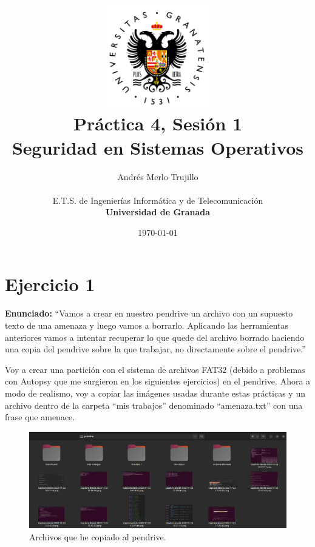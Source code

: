 \documentclass{article}
\title{
\includegraphics[width=1.75in]{imagenes/UGR-Logo.png} \\
\vspace*{1in}
\textbf{Práctica 4, Sesión 1} \\
Seguridad en Sistemas Operativos \\
\vspace*{0.5in}}
\author{Andrés Merlo Trujillo \\
\vspace*{0.5in} \\
E.T.S. de Ingenierías Informática y de Telecomunicación \\
\textbf{Universidad de Granada}} \date{\today}
\begin{document}
\begin{titlingpage}
\maketitle
\end{titlingpage}

\newpage

\tableofcontents

\newpage

\pagestyle{fancy}

{}
\section*{Ejercicio 1}

\textbf{Enunciado:} ``Vamos a crear en nuestro pendrive un archivo con un supuesto texto de una amenaza y luego vamos a borrarlo. Aplicando las herramientas anteriores vamos a intentar recuperar lo que quede del archivo borrado haciendo una copia del pendrive sobre la que trabajar, no directamente
sobre el pendrive.''

\bigskip

Voy a crear una partición con el sistema de archivos FAT32 (debido a problemas con Autopsy que me surgieron en los siguientes ejercicios) en el pendrive. Ahora a modo de realismo, voy a copiar las imágenes usadas durante estas prácticas y un archivo dentro de la carpeta ``mis trabajos'' denominado ``amenaza.txt'' con una frase que amenace.

\begin{figure}[H]
    \centering
    \includegraphics[width=\textwidth]{imagenes/Captura desde 2022-12-02 17-34-22.png}
    \caption{Archivos que he copiado al pendrive.}
\end{figure}
\end{document}
